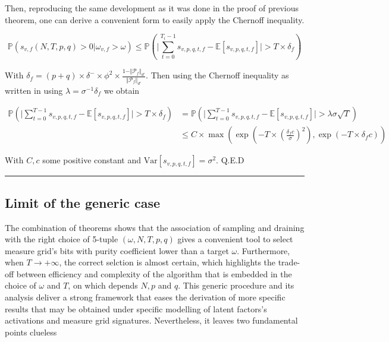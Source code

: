 \documentclass[a4paper, 11pt]{article}
\newcommand{\Var}{\mathrm{Var}}
\begin{document}
Then, reproducing the same development as it was done in the proof of previous theorem, one can derive a convenient form to easily apply the Chernoff inequality.

\begin{equation*}
\mathbb{P} \left( s_{v, f}(N, T, p, q) > 0 \vert \omega_{v, f} > \omega \right) \leq \mathbb{P}\left(\vert \sum_{t=0}^{T_i - 1} s_{v, p, q, t, f} - \mathbb{E}\left[s_{v, p, q, t, f}\right] \vert > T \times \delta_{f} \right)
\end{equation*}

With $\delta_{f} = (p + q) \times \delta^{-} \times \phi^{2} \times \frac{1 - \Vert \mathcal{P}_{f} \Vert_{d'}}{\Vert \mathcal{P}_{f} \Vert_{d'}}$. Then using the Chernoff inequality as written in \cite{TAO-1} using $\lambda = \sigma^{-1} \delta_{f}$ we obtain


\begin{align*}
\mathbb{P}\left(\vert \sum_{t=0}^{T - 1} s_{v, p, q, t, f} - \mathbb{E}\left[s_{v, p, q, t, f}\right] \vert > T \times \delta_{f} \right) &= \mathbb{P}\left(\vert \sum_{t=0}^{T - 1} s_{v, p, q, t, f} - \mathbb{E}\left[s_{v, p, q, t, f}\right] \vert > \lambda \sigma \sqrt{T} \right) \\
&\leq C \times \max \left( \exp\left(- T \times \left(\frac{\delta_{f} c}{\sigma}\right)^2 \right), \exp\left(- T \times \delta_{f}c \right) \right)
\end{align*}

With $C, c$ some positive constant and $\Var[s_{v, p, q, t, f}] = \sigma^2$. Q.E.D

\begin{center}
\rule[0pt]{100pt}{1pt} 
\end{center}

\subsection{Limit of the generic case}

The combination of theorems shows that the association of sampling and draining with the right choice of 5-tuple $(\omega, N, T, p, q)$ gives a convenient tool to select measure grid's bits with purity coefficient lower than a target $\omega$. Furthermore, when $T \rightarrow +\infty$, the correct selction is almost certain, which highlights the trade-off between efficiency and complexity of the algorithm that is embedded in the choice of $\omega$ and $T$, on which depends $N, p$ and $q$.
This generic procedure and its analysis deliver a strong framework that eases the derivation of more specific results that may be obtained under specific modelling of latent factors's activations and measure grid signatures. Nevertheless, it leaves two fundamental points clueless 
\end{document}
